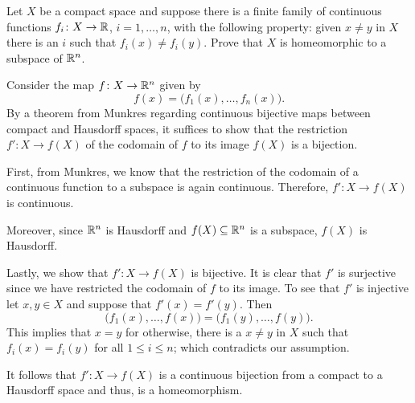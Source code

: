 \begin{problem}
  Let \(X\) be a compact space and suppose there is a finite family of
  continuous functions \(f_i\colon X\to\mathbb{R}\), \(i=1,\dotsc,n\), with the
  following property: given \(x\neq y\) in \(X\) there is an \(i\) such
  that \(f_i(x)\neq f_i(y)\). Prove that \(X\) is homeomorphic to a
  subspace of \(\mathbb{R}^n\).
\end{problem}
\begin{solution}
  Consider the map \(f\colon X\to\mathbb{R}^n\) given by
  \[
    f(x)=\bigl(f_1(x),\dotsc,f_n(x)\bigr).
  \]
  By a theorem from Munkres regarding continuous bijective maps between
  compact and Hausdorff spaces, it suffices to show that the restriction
  \(f'\colon X\to f(X)\) of the codomain of \(f\) to its image \(f(X)\) is
  a bijection.

  First, from Munkres, we know that the restriction of the codomain of a
  continuous function to a subspace is again continuous. Therefore,
  \(f'\colon X\to f(X)\) is continuous.

  Moreover, since \(\mathbb{R}^n\) is Hausdorff and \(f(X)\subseteq\mathbb{R}^n\) is a
  subspace, \(f(X)\) is Hausdorff.

  Lastly, we show that \(f'\colon X\to f(X)\) is bijective. It is clear
  that \(f'\) is surjective since we have restricted the codomain of \(f\)
  to its image. To see that \(f'\) is injective let \(x,y\in X\) and
  suppose that \(f'(x)=f'(y)\). Then
  \[
    \bigl(f_1(x),\dotsc,f(x)\bigr)= \bigl(f_1(y),\dotsc,f(y)\bigr).
  \]
  This implies that \(x=y\) for otherwise, there is a \(x\neq y\) in \(X\)
  such that \(f_i(x)=f_i(y)\) for all \(1\leq i\leq n\); which contradicts
  our assumption.

  It follows that \(f'\colon X\to f(X)\) is a continuous bijection from a
  compact to a Hausdorff space and thus, is a homeomorphism.
\end{solution}

